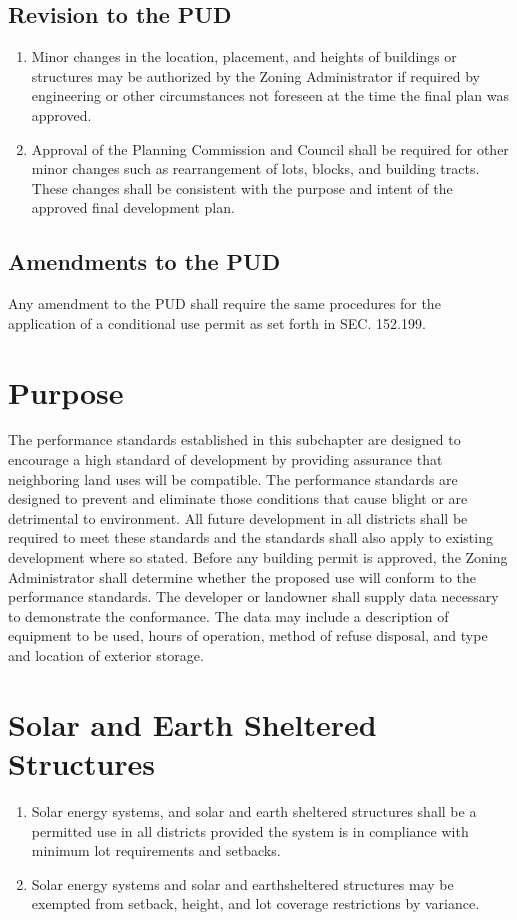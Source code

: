 \subsection{Revision to the PUD}
\begin{enumerate}[{\indent}1)]
    \item Minor changes in the location, placement, and heights of buildings or structures may be authorized by the Zoning Administrator if required by engineering or other circumstances not foreseen at the time the final plan was approved.
    \item Approval of the Planning Commission and Council shall be required for other minor changes such as rearrangement of lots, blocks, and building tracts.  These changes shall be consistent with the purpose and intent of the approved final development plan.
\end{enumerate}
\subsection{Amendments to the PUD}
Any amendment to the PUD shall require the same procedures for the application of a conditional use permit as set forth in SEC. 152.199.


\setcounter{section}{154}
\section{Purpose}
The performance standards established in this subchapter are designed to encourage a high standard of development by providing assurance that neighboring land uses will be compatible. The performance standards are designed to prevent and eliminate those conditions that cause blight or are detrimental to environment. All future development in all districts shall be required to meet these standards and the standards shall also apply to existing development where so stated. Before any building permit is approved, the Zoning Administrator shall determine whether the proposed use will conform to the performance standards. The developer or landowner shall supply data necessary to demonstrate the conformance.  The data may include a description of equipment to be used, hours of operation, method of refuse disposal, and type and location of exterior storage.

\section{Solar and Earth Sheltered Structures}
\begin{enumerate}[{\indent}A)]
    \item Solar energy systems, and solar and earth sheltered structures shall be a permitted use in all districts provided the system is in compliance with minimum lot requirements and setbacks.
    \item Solar energy systems and solar and earthsheltered structures may be exempted from setback, height, and lot coverage restrictions by variance.
\end{enumerate}

